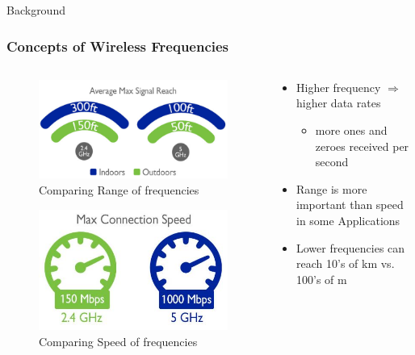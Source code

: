 \documentclass{beamer}
\begin{document}
\begin{frame}{Background}
  \frametitle{Concepts of Wireless Frequencies}
  \begin{columns}
    \begin{column}{0.5\textwidth}
        \begin{figure}[htbp]
          \centering
          \includegraphics[width=.8\textwidth, height=.20\textheight]{WiFi-frequency-reach.jpg}
          \caption{Comparing Range of frequencies \cite{WiFiFreqImOn}}
          \label{fig:WiFi-frequency-reach}
        \end{figure}
        \begin{figure}[htbp]
          \centering
          \includegraphics[width=.8\textwidth, height=.20\textheight]{WiFi-frequency-speed.jpg}
          \caption{Comparing Speed of frequencies \cite{WiFiFreqImOn}}
          \label{fig:WiFi-frequency-speed}
        \end{figure}
    \end{column}
    \begin{column}{0.5\textwidth}
          \begin{itemize}
            \item Higher frequency $\Rightarrow$ higher data rates 
              \begin{itemize}
                \item more ones and zeroes received per second
              \end{itemize}
            \item Range is more important than speed in some Applications
            \item Lower frequencies can reach 10's of km vs. 100's of m
          \end{itemize}
    \end{column}
  \end{columns}
\end{frame}
\end{document}
